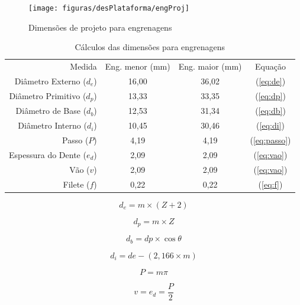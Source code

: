 \begin{figure}[htb]
	\centering
	\caption{Dimensões de projeto para engrenagens}
	\texttt{[image: figuras/desPlataforma/engProj]}
	\label{fig:engProj}
\end{figure}

\begin{table}[!htb]
	\centering
	\caption{Cálculos das dimensões para engrenagens}
	\begin{tabular}{r|c|c|c}
		Medida & Eng. menor (mm) & Eng. maior (mm) & Equação\\
		Diâmetro Externo ($ d_e $) & 16,00 & 36,02 & (\ref{eq:de})\\
		Diâmetro Primitivo ($ d_p $) & 13,33 & 33,35 & (\ref{eq:dp})\\
		Diâmetro de Base ($ d_b $) & 12,53 & 31,34 & (\ref{eq:db})\\
		Diâmetro Interno ($ d_i $) & 10,45 & 30,46 & (\ref{eq:di})\\
		Passo ($ P $) & 4,19 & 4,19 & (\ref{eq:passo})\\
		Espessura do Dente ($ e_d $) & 2,09 & 2,09 & (\ref{eq:vao})\\
		Vão ($ v $) & 2,09 & 2,09 & (\ref{eq:vao})\\
		Filete ($ f $) & 0,22 & 0,22 & (\ref{eq:f})\\
	\end{tabular}
	\label{tab:engrenagens}
	
\end{table}

\begin{equation}
	d_e = m \times (Z + 2)
	\label{eq:de}
\end{equation}

\begin{equation}
	d_p = m \times Z
	\label{eq:dp}
\end{equation}

\begin{equation}
	d_b = dp\times\cos \theta
	\label{eq:db}
\end{equation}

\begin{equation}
	d_i = de-(2,166\times m)
	\label{eq:di}
\end{equation}

\begin{equation}
	P = m\pi
	\label{eq:passo}
\end{equation}

\begin{equation}
	v = e_d = \dfrac{P}{2}
	\label{eq:vao}
\end{equation}

